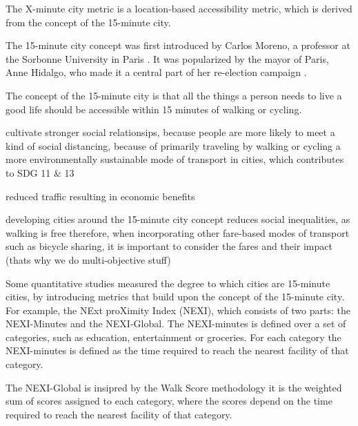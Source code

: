 
The X-minute city metric is a location-based accessibility metric, which is derived from the concept of the 15-minute city.

The 15-minute city concept was first introduced by Carlos Moreno, a professor at the Sorbonne University in Paris \cite{morenoIntroducing15MinuteCity2021}.
It was popularized by the mayor of Paris, Anne Hidalgo, who made it a central part of her re-election campaign \cite{gongadzeParisVision15Minute2023}.

The concept of the 15-minute city is that all the things a person needs to live a good life should be accessible within 15 minutes of walking or cycling.

cultivate stronger social relationsips, because people are more likely to meet \cite{allamProximityBasedPlanning15Minute2020}
a kind of social distancing, because of primarily traveling by walking or cycling \cite{allamProximityBasedPlanning15Minute2020}
a more environmentally sustainable mode of transport in cities, which contributes to SDG 11 \& 13 \cite{allamProximityBasedPlanning15Minute2020} \cite{papasUrbanMobilityEvolution2023}

reduced traffic resulting in economic benefits \cite{allamProximityBasedPlanning15Minute2020} \cite{papasUrbanMobilityEvolution2023}

developing cities around the 15-minute city concept reduces social inequalities, as walking is free \cite{weng15minuteWalkableNeighborhoods2019b} \cite{gustafsonExaminingSpatialChange2022}
therefore, when incorporating other fare-based modes of transport such as bicycle sharing, it is important to consider the fares and their impact (thats why we do multi-objective stuff)

Some quantitative studies measured the degree to which cities are 15-minute cities, by introducing metrics that build upon the concept of the 15-minute city.
For example, \cite{olivariAreItalianCities2023} the NExt proXimity Index (NEXI), which consists of two parts: the NEXI-Minutes and the NEXI-Global.
The NEXI-minutes is defined over a set of categories, such as education, entertainment or groceries.
For each category the NEXI-minutes is defined as the time required to reach the nearest facility of that category.

The NEXI-Global is insipred by the Walk Score methodology \cite{WalkScoreMethodology} it is the weighted sum of scores assigned to each category, where the scores depend on the time required to reach the nearest facility of that category.

